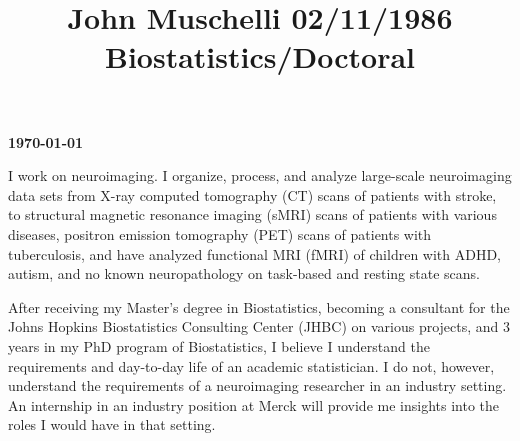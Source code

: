 \documentclass[12pt]{article}
\title{John Muschelli  \hfill 02/11/1986 \hfill Biostatistics/Doctoral} %
\newcommand{\company}{{Merck }}
\begin{document}
\newbox\TempBox \newbox\TempBoxA
%
\def\undertilde#1{%
  \ifmmode\setbox\TempBox=\hbox{$#1$}\else\setbox\TempBox=\hbox{#1}\fi%
  \setbox\TempBoxA=\hbox to \wd\TempBox{\hss\char'176\hss}%
  \rlap{\copy\TempBox}\smash{\lower9pt\hbox{\copy\TempBoxA}}%
}
%
\def\undertildelow#1{%
  \ifmmode\setbox\TempBox=\hbox{$#1$}\else\setbox\TempBox=\hbox{#1}\fi%
  \setbox\TempBoxA=\hbox to \wd\TempBox{\hss\char'176\hss}%
  \rlap{\copy\TempBox}\smash{\lower10pt\hbox{\copy\TempBoxA}}%
}




\hfill {\bf \today\\}

\doublespacing
I work on neuroimaging.  I organize, process, and analyze large-scale neuroimaging data sets from X-ray computed tomography (CT) scans of patients with stroke, to structural magnetic resonance imaging (sMRI) scans of patients with various diseases, positron emission tomography (PET) scans of patients with tuberculosis, and have analyzed functional MRI (fMRI) of children with ADHD, autism, and no known neuropathology on task-based and resting state scans.  

After receiving my Master's degree in Biostatistics, becoming a consultant for the Johns Hopkins Biostatistics Consulting Center (JHBC) on various projects, and 3 years in my PhD program of Biostatistics, I believe I understand the requirements and day-to-day life of an academic statistician.  I do not, however, understand the requirements of a neuroimaging researcher in an industry setting.  An internship in an industry position at \company will provide me insights into the roles I would have in that setting.
\end{document}

